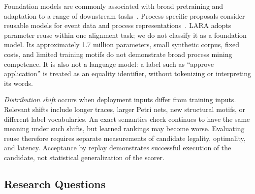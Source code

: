 \begin{revised}Foundation models are commonly associated with broad pretraining and adaptation to a range of downstream tasks~\cite{Bommasani2021}. Process specific proposals consider reusable models for event data and process representations~\cite{Rizk2024}. LARA adopts parameter reuse within one alignment task; we do not classify it as a foundation model. Its approximately 1.7 million parameters, small synthetic corpus, fixed costs, and limited training motifs do not demonstrate broad process mining competence. It is also not a language model: a label such as ``approve application'' is treated as an equality identifier, without tokenizing or interpreting its words.\end{revised}

\emph{Distribution shift} occurs when deployment inputs differ from training inputs. Relevant shifts include longer traces, larger Petri nets, new structural motifs, or different label vocabularies. An exact semantics check continues to have the same meaning under such shifts, but learned rankings may become worse. Evaluating reuse therefore requires separate measurements of candidate legality, optimality, and latency. Acceptance by replay demonstrates successful execution of the candidate, not statistical generalization of the scorer.

\subsection{Research Questions}
\label{sec:rqs}


